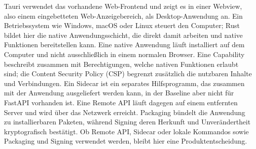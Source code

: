 \begin{beginnerstatement}

Tauri verwendet das vorhandene Web-Frontend und zeigt es in einer Webview,
also einem eingebetteten Web-Anzeigebereich, als Desktop-Anwendung an. Ein
Betriebssystem wie Windows, macOS oder Linux steuert den Computer; Rust bildet
hier die native Anwendungsschicht, die direkt damit arbeiten und native
Funktionen bereitstellen kann. Eine native Anwendung läuft
installiert auf dem Computer und nicht ausschließlich in einem normalen
Browser. Eine Capability beschreibt zusammen mit Berechtigungen, welche
nativen Funktionen erlaubt sind; die Content Security Policy (CSP) begrenzt
zusätzlich die nutzbaren Inhalte und Verbindungen. Ein Sidecar ist ein separates
Hilfsprogramm, das zusammen mit der Anwendung ausgeliefert werden kann, in der
Baseline aber nicht für FastAPI vorhanden ist. Eine Remote API läuft dagegen
auf einem entfernten Server und wird über das Netzwerk erreicht. Packaging
bündelt die Anwendung zu installierbaren Paketen, während Signing deren
Herkunft und Unverändertheit kryptografisch bestätigt. Ob Remote API, Sidecar
oder lokale Kommandos sowie Packaging und Signing verwendet werden, bleibt
hier eine Produktentscheidung.

\end{beginnerstatement}

